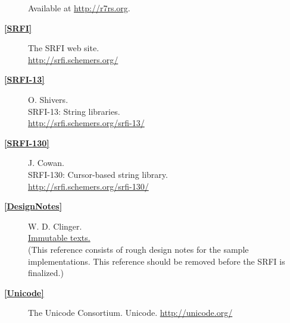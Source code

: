 \begin{description}
Available at \url{http://r7rs.org}.
\item[\textbf{\href{}{{[}SRFI{]}}}]
The SRFI web site.\\
\url{http://srfi.schemers.org/}
\item[\textbf{\href{}{{[}SRFI-13{]}}}]
O. Shivers.\\
SRFI-13: String libraries.\\
\url{http://srfi.schemers.org/srfi-13/}
\item[\textbf{\href{}{{[}SRFI-130{]}}} ]
J. Cowan.\\
SRFI-130: Cursor-based string library.\\
\url{http://srfi.schemers.org/srfi-130/}
\item[\textbf{\href{}{{[}DesignNotes{]}}} ]
W. D. Clinger.\\
\href{https://github.com/larcenists/larceny/wiki/ImmutableTexts}{Immutable
texts.}\\
(This reference consists of rough design notes for the sample
implementations. This reference should be removed before the SRFI is
finalized.)
\item[\textbf{\href{}{{[}Unicode{]}}} ]
The Unicode Consortium. Unicode. \url{http://unicode.org/}
\end{description}
